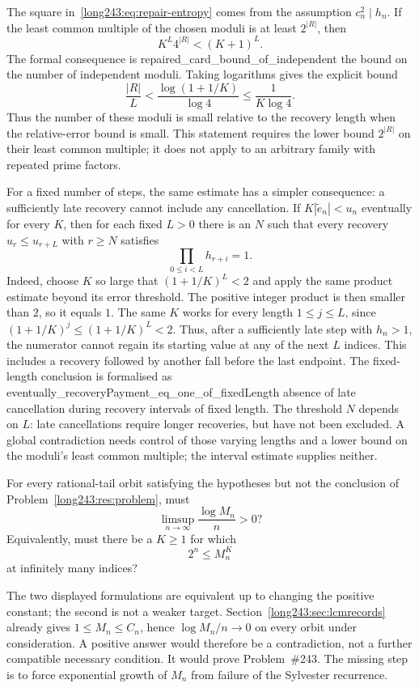 The square in~\eqref{long243:eq:repair-entropy} comes from the assumption
$c_n^2\mid h_n$. If the least common multiple of the chosen moduli
is at least $2^{|R|}$, then
\[
 K^L4^{|R|}<(K+1)^L.
\]
The formal consequence is
      {repaired_card_bound_of_independent}
      {the bound on the number of independent moduli}.
Taking logarithms gives the explicit bound
\[
 \frac{|R|}{L}<\frac{\log(1+1/K)}{\log4}
 \le\frac1{K\log4}.
\]
Thus the number of these moduli is small relative to the recovery length
when the relative-error bound is small. This statement requires the lower bound
$2^{|R|}$ on their least common multiple; it does not apply to an arbitrary
family with repeated prime factors.

For a fixed number of steps, the same estimate has a simpler consequence:
a sufficiently late recovery cannot include any cancellation.  If
$K|\tilde e_n|<u_n$ eventually for every $K$, then for each fixed $L>0$ there is an
$N$ such that every recovery $u_r\le u_{r+L}$ with $r\ge N$ satisfies
\[
 \prod_{0\le i<L}h_{r+i}=1.
\]
Indeed, choose $K$ so large that $(1+1/K)^L<2$ and apply the same
product estimate beyond its error threshold. The positive integer
product is then smaller than $2$, so it equals $1$.
The same $K$ works for every length $1\le j\le L$, since
$(1+1/K)^j\le(1+1/K)^L<2$. Thus, after a sufficiently late step with
$h_n>1$, the numerator cannot regain its starting value at any of the
next $L$ indices. This includes a recovery followed by another fall
before the last endpoint. The fixed-length conclusion is formalised as
      {eventually_recoveryPayment_eq_one_of_fixedLength}
      {absence of late cancellation during recovery intervals of fixed length}.
The threshold $N$ depends on $L$: late cancellations require longer
recoveries, but have not been excluded. A global contradiction needs
control of those varying lengths and a lower bound on the moduli's
least common multiple; the interval estimate supplies neither.

\begin{problem}\label{long243:res:lcmheight}
For every rational-tail orbit satisfying the hypotheses but not the conclusion of Problem~\ref{long243:res:problem},
must
\[
 \limsup_{n\to\infty}\frac{\log M_n}{n}>0?
\]
Equivalently, must there be a $K\ge1$ for which
\[
 2^n\le M_n^K
\]
at infinitely many indices?
\end{problem}

The two displayed formulations are equivalent up to changing the
positive constant; the second is not a weaker target.
Section~\ref{long243:sec:lcmrecords} already gives
$1\le M_n\le C_n$, hence $\log M_n/n\to0$ on every orbit under
consideration. A positive answer would therefore be a contradiction,
not a further compatible necessary condition. It would prove
Problem~\#243. The missing step is to force exponential growth of $M_n$
from failure of the Sylvester recurrence.

